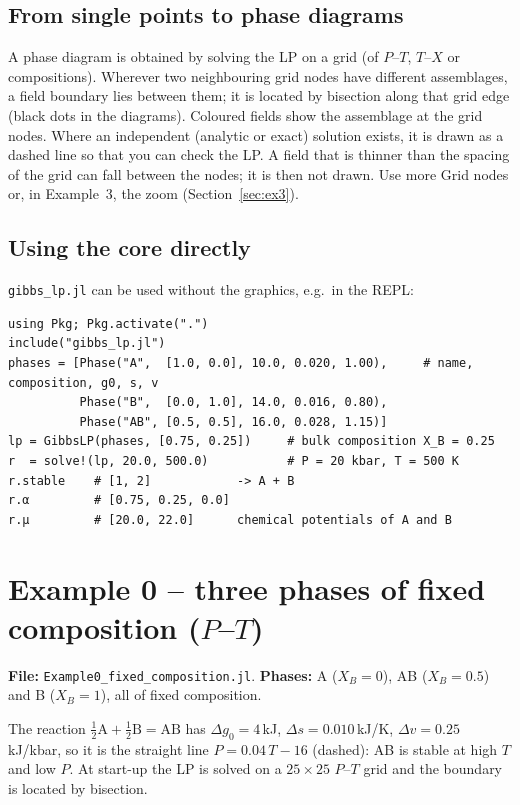 \documentclass[11pt,a4paper]{article}
\newcommand{\ctl}[1]{\textsf{#1}}                              %
\newcommand{\file}[1]{\texttt{#1}}
\begin{document}
\subsection{From single points to phase diagrams}
A phase diagram is obtained by solving the LP on a grid (of $P$–$T$, $T$–$X$ or compositions). Wherever two
neighbouring grid nodes have different assemblages, a field boundary lies between them; it is located by
bisection along that grid edge (black dots in the diagrams). Coloured fields show the assemblage at the grid
nodes. Where an independent (analytic or exact) solution exists, it is drawn as a dashed line so that you can
check the LP. A field that is thinner than the spacing of the grid can fall between the nodes; it is then not
drawn. Use more \ctl{Grid nodes} or, in Example~3, the zoom (Section~\ref{sec:ex3}).

\subsection{Using the core directly}
\file{gibbs\_lp.jl} can be used without the graphics, e.g.\ in the REPL:
\begin{lstlisting}
using Pkg; Pkg.activate(".")
include("gibbs_lp.jl")
phases = [Phase("A",  [1.0, 0.0], 10.0, 0.020, 1.00),     # name, composition, g0, s, v
          Phase("B",  [0.0, 1.0], 14.0, 0.016, 0.80),
          Phase("AB", [0.5, 0.5], 16.0, 0.028, 1.15)]
lp = GibbsLP(phases, [0.75, 0.25])     # bulk composition X_B = 0.25
r  = solve!(lp, 20.0, 500.0)           # P = 20 kbar, T = 500 K
r.stable    # [1, 2]            -> A + B
r.α         # [0.75, 0.25, 0.0]
r.μ         # [20.0, 22.0]      chemical potentials of A and B
\end{lstlisting}

\clearpage
\section{Example 0 – three phases of fixed composition (\texorpdfstring{$P$–$T$}{P–T})}\label{sec:ex0}
\textbf{File:} \file{Example0\_fixed\_composition.jl}.\quad
\textbf{Phases:} A ($X_B = 0$), AB ($X_B = 0.5$) and B ($X_B = 1$), all of fixed composition.

The reaction $\tfrac12\mathrm{A} + \tfrac12\mathrm{B} = \mathrm{AB}$ has
$\Delta g_0 = 4$\,kJ, $\Delta s = 0.010$\,kJ/K, $\Delta v = 0.25$\,kJ/kbar, so it is the straight line
$P = 0.04\,T - 16$ (dashed): AB is stable at high $T$ and low $P$. At start-up the LP is solved on a
$25\times25$ $P$–$T$ grid and the boundary is located by bisection.
\end{document}
